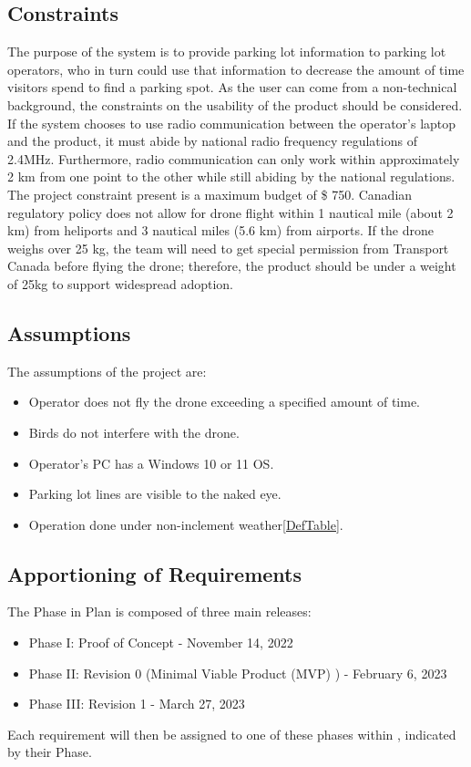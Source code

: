 \documentclass{article}
\begin{document}
\subsection{Constraints}
\label{sec:Constraints}
The purpose of the system is to provide parking lot information to parking lot operators, who in turn could use that information to decrease the amount of time visitors spend to find a parking spot. As the user can come from a non-technical background, the constraints on the usability of the product should be considered. If the system chooses to use radio communication between the operator's laptop and the product, it must abide by national radio frequency regulations of 2.4MHz. Furthermore, radio communication can only work within approximately 2 km from one point to the other while still abiding by the national regulations. The project constraint present is a maximum budget of \$ 750.  Canadian regulatory policy does not allow for drone flight within 1 nautical mile (about 2 km) from heliports and 3 nautical miles (5.6 km) from airports\cite{canada_flying_2020}. If the drone weighs over 25 kg, the team will need to get special permission from Transport Canada before flying the drone\cite{canada_find_2021}; therefore, the product should be under a weight of 25kg to support widespread adoption.
\subsection{Assumptions}
\label{sec:Assumptions}
The assumptions of the project are:
\begin{itemize}

  \item Operator does not fly the drone exceeding a specified amount of time.
  \item Birds do not interfere with the drone.
  \item Operator's PC has a Windows 10 or 11 OS.
  \item Parking lot lines are visible to the naked eye.
  \item Operation done under non-inclement weather\ref{DefTable}. 

\end{itemize}

\subsection{Apportioning of Requirements}
The Phase in Plan is composed of three main releases:  
\begin{itemize}
    \item Phase I: Proof of Concept - November 14, 2022
    \item Phase II: Revision 0 (Minimal Viable Product (MVP) ) - February 6, 2023 
    \item Phase III: Revision 1 - March 27, 2023
\end{itemize}
Each requirement will then be assigned to one of these phases within , indicated by their Phase. 
\end{document}
